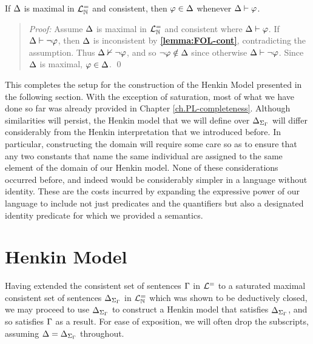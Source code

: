 \begin{Lthm} \label{lemma:FOL-deductive}
  If $\Delta$ is maximal in $\mathcal{L}^{=}_{\mathbb{N}}$ and consistent, then $\varphi\in\Delta$ whenever $\Delta\vdash\varphi$.
\end{Lthm}

\begin{quote} 
  \textit{Proof:} Assume $\Delta$ is maximal in $\mathcal{L}^{=}_{\mathbb{N}}$ and consistent where $\Delta\vdash\varphi$.
  If $\Delta\vdash\neg\varphi$, then $\Delta$ is inconsistent by \textbf{\ref{lemma:FOL-cont}}, contradicting the assumption.
  Thus $\Delta\nvdash\neg\varphi$, and so $\neg\varphi\notin\Delta$ since otherwise $\Delta\vdash\neg\varphi$. 
  Since $\Delta$ is maximal, $\varphi\in\Delta$. 
  \qed
\end{quote}

This completes the setup for the construction of the Henkin Model presented in the following section.
With the exception of saturation, most of what we have done so far was already provided in Chapter \ref{ch.PL-completeness}.
Although similarities will persist, the Henkin model that we will define over $\Delta_{\Sigma_{\Gamma}}$ will differ considerably from the Henkin interpretation that we introduced before. 
In particular, constructing the domain will require some care so as to ensure that any two constants that name the same individual are assigned to the same element of the domain of our Henkin model.
None of these considerations occurred before, and indeed would be considerably simpler in a language without identity.
These are the costs incurred by expanding the expressive power of our language to include not just predicates and the quantifiers but also a designated identity predicate for which we provided a semantics.





\section{Henkin Model}%
  \label{sub:HenkinModel}

Having extended the consistent set of sentences $\Gamma$ in $\mathcal{L}^{=}$ to a saturated maximal consistent set of sentences $\Delta_{\Sigma_{\Gamma}}$ in $\mathcal{L}^{=}_{\mathbb{N}}$ which was shown to be deductively closed, we may proceed to use $\Delta_{\Sigma_{\Gamma}}$ to construct a Henkin model that satisfies $\Delta_{\Sigma_{\Gamma}}$, and so satisfies $\Gamma$ as a result.
For ease of exposition, we will often drop the subscripts, assuming $\Delta=\Delta_{\Sigma_{\Gamma}}$ throughout.

